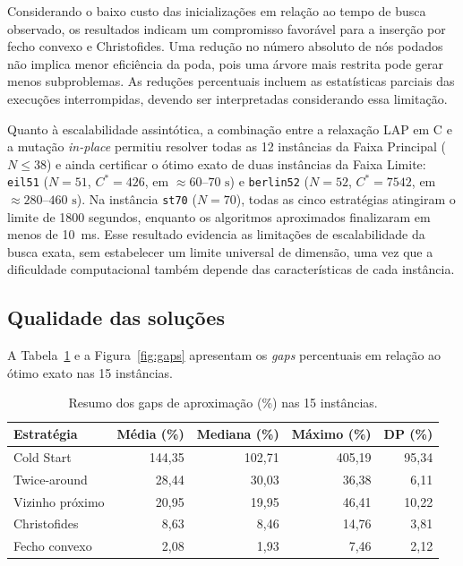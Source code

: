 Considerando o baixo custo das inicializações em relação ao tempo de busca observado, os resultados indicam um compromisso favorável para a inserção por fecho convexo e Christofides. Uma redução no número absoluto de nós podados não implica menor eficiência da poda, pois uma árvore mais restrita pode gerar menos subproblemas. As reduções percentuais incluem as estatísticas parciais das execuções interrompidas, devendo ser interpretadas considerando essa limitação.

Quanto à escalabilidade assintótica, a combinação entre a relaxação LAP em C e a mutação \textit{in-place} permitiu resolver todas as 12 instâncias da Faixa Principal ($N \leq 38$) e ainda certificar o ótimo exato de duas instâncias da Faixa Limite: \texttt{eil51} ($N=51$, $C^*=426$, em $\approx 60\text{--}70\text{ s}$) e \texttt{berlin52} ($N=52$, $C^*=7542$, em $\approx 280\text{--}460\text{ s}$). Na instância \texttt{st70} ($N=70$), todas as cinco estratégias atingiram o limite de 1800 segundos, enquanto os algoritmos aproximados finalizaram em menos de 10~ms. Esse resultado evidencia as limitações de escalabilidade da busca exata, sem estabelecer um limite universal de dimensão, uma vez que a dificuldade computacional também depende das características de cada instância.

\subsection{Qualidade das soluções}

A Tabela~\ref{tab:gaps} e a Figura~\ref{fig:gaps} apresentam os \textit{gaps} percentuais em relação ao ótimo exato nas 15 instâncias.

\begin{table}[ht]
\centering
\caption{Resumo dos gaps de aproximação (\%) nas 15 instâncias.}
\label{tab:gaps}
\small
\begin{tabular}{lrrrr}
\toprule
Estratégia & Média (\%) & Mediana (\%) & Máximo (\%) & DP (\%) \\
\midrule
Cold Start & 144,35 & 102,71 & 405,19 & 95,34 \\
Twice-around & 28,44 & 30,03 & 36,38 & 6,11 \\
Vizinho próximo & 20,95 & 19,95 & 46,41 & 10,22 \\
Christofides & 8,63 & 8,46 & 14,76 & 3,81 \\
Fecho convexo & 2,08 & 1,93 & 7,46 & 2,12 \\
\bottomrule
\end{tabular}
\end{table}

